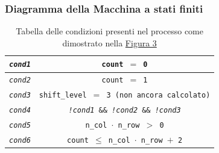 \documentclass{article}
\begin{document}
\subsubsection{Diagramma della Macchina a stati finiti}
\begin{table}[h]
    \centering
    \caption{Tabella delle condizioni presenti nel processo come dimostrato nella \hyperref[fig:fsm]{Figura 3}}
    \begin{tabular}{||c|c||}
        \hline
        \texttt{\emph{cond1}} & \texttt{count $=$ 0} \\
        \hline
        \texttt{\emph{cond2}} & \texttt{count $=$ 1} \\
        \hline
        \texttt{\emph{cond3}} & \texttt{shift\_level $=$ 3 (non ancora calcolato)} \\
        \hline
        \texttt{\emph{cond4}} & \texttt{\emph{!cond1} \&\& \emph{!cond2} \&\& \emph{!cond3}} \\   
        \hline
        \texttt{\emph{cond5}} & \texttt{n\_col $\cdot$ n\_row $>$ 0} \\
        \hline
        \texttt{\emph{cond6}} & \texttt{count $\leq$ n\_col $\cdot$ n\_row $+$ 2} \\      
        \hline
        \end{tabular}
\end{table}
\pagebreak
\end{document}
